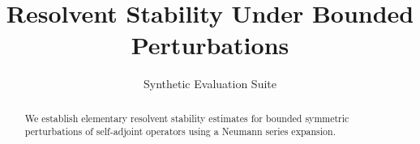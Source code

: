 \documentclass{article}
\title{Resolvent Stability Under Bounded Perturbations}
\author{Synthetic Evaluation Suite}
\date{}
\begin{document}
\maketitle

\begin{abstract}
We establish elementary resolvent stability estimates for bounded symmetric
perturbations of self-adjoint operators using a Neumann series expansion.
\end{abstract}




\end{document}
